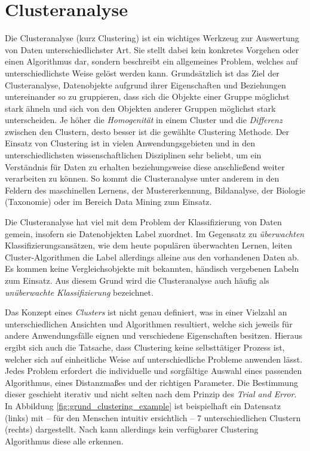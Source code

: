 
\section{Clusteranalyse}
\label{sec:tra_clustering}

Die Clusteranalyse (kurz Clustering) ist ein wichtiges Werkzeug zur Auswertung von Daten unterschiedlichster
Art. Sie stellt dabei kein konkretes Vorgehen oder einen Algorithmus dar, sondern beschreibt ein
allgemeines Problem, welches auf unterschiedlichste Weise gelöst werden kann.
Grundsätzlich ist das Ziel der Clusteranalyse, Datenobjekte aufgrund ihrer Eigenschaften und Beziehungen
untereinander so zu gruppieren, dass sich die Objekte einer Gruppe möglichst stark ähneln und sich
von den Objekten anderer Gruppen möglichst stark unterscheiden. Je höher die \textit{Homogenität} in einem Cluster
und die \textit{Differenz} zwischen den Clustern, desto besser ist die gewählte Clustering Methode.
Der Einsatz von Clustering ist in vielen Anwendungsgebieten und in den unterschiedlichsten wissenschaftlichen
Disziplinen sehr beliebt, um ein Verständnis für Daten zu erhalten beziehungsweise diese anschließend weiter
verarbeiten zu können.
So kommt die Clusteranalyse unter anderem in den Feldern des maschinellen Lernens, der Mustererkennung, Bildanalyse,
der Biologie (Taxonomie) oder im Bereich Data Mining zum Einsatz. \cite[]{tan2007introduction}

Die Clusteranalyse hat viel mit dem Problem der Klassifizierung von Daten gemein, insofern sie Datenobjekten
Label zuordnet. Im Gegensatz zu \textit{überwachten} Klassifizierungsansätzen, wie dem heute populären überwachten
Lernen, leiten Cluster-Algorithmen die Label allerdings alleine aus den vorhandenen Daten ab.
Es kommen keine Vergleichsobjekte mit bekannten, händisch vergebenen Labeln zum Einsatz.
Aus diesem Grund wird die Clusteranalyse auch häufig als \textit{unüberwachte Klassifizierung} bezeichnet. \cite[]{tan2007introduction}

Das Konzept eines \textit{Clusters} ist nicht genau definiert, was in einer Vielzahl an unterschiedlichen Ansichten
und Algorithmen resultiert, welche sich jeweils für andere Anwendungsfälle eignen und verschiedene Eigenschaften
besitzen. Hieraus ergibt sich auch die Tatsache, dass Clustering keine selbsttätiger Prozess ist, welcher sich auf
einheitliche Weise auf unterschiedliche Probleme anwenden lässt. Jedes Problem erfordert die individuelle und sorgfältige
Auswahl eines passenden Algorithmus, eines Distanzmaßes und der richtigen Parameter. Die Bestimmung dieser geschieht
iterativ und nicht selten nach dem Prinzip des \textit{Trial and Error}. In Abbildung \ref{fig:grund_clustering_example}
ist beispielhaft ein Datensatz (links) mit -- für den Menschen intuitiv ersichtlich -- 7 unterschiedlichen Clustern (rechts)
dargestellt. Nach \cite[]{Jain2010} kann allerdings kein verfügbarer Clustering Algorithmus diese alle erkennen.
\cite[]{Jain1999, tan2007introduction}


